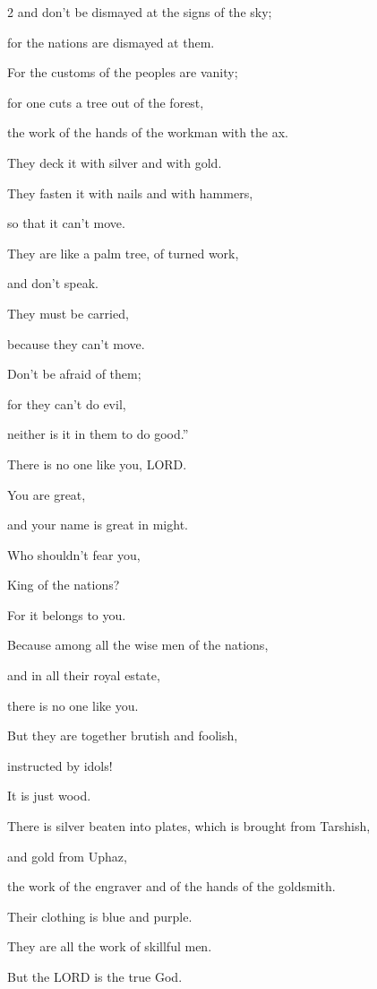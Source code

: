\begin{multicols}{2}
	and don’t be dismayed at the signs of the sky;
	
	for the nations are dismayed at them.
	
	
	\myverse{}For the customs of the peoples are vanity;
	
	for one cuts a tree out of the forest,
	
	the work of the hands of the workman with the ax.
	
	
	\myverse{}They deck it with silver and with gold.
	
	They fasten it with nails and with hammers,
	
	so that it can’t move.
	
	
	\myverse{}They are like a palm tree, of turned work,
	
	and don’t speak.
	
	They must be carried,
	
	because they can’t move.
	
	Don’t be afraid of them;
	
	for they can’t do evil,
	
	neither is it in them to do good.”
	
	
	\myverse{}There is no one like you, LORD.
	
	You are great,
	
	and your name is great in might.
	
	
	\myverse{}Who shouldn’t fear you,
	
	King of the nations?
	
	For it belongs to you.
	
	Because among all the wise men of the nations,
	
	and in all their royal estate,
	
	there is no one like you.
	
	
	\myverse{}But they are together brutish and foolish,
	
	instructed by idols!
	
	It is just wood.
	
	
	\myverse{}There is silver beaten into plates, which is brought from Tarshish,
	
	and gold from Uphaz,
	
	the work of the engraver and of the hands of the goldsmith.
	
	Their clothing is blue and purple.
	
	They are all the work of skillful men.
	
	
	\myverse{}But the LORD is the true God.
	

\end{multicols}

